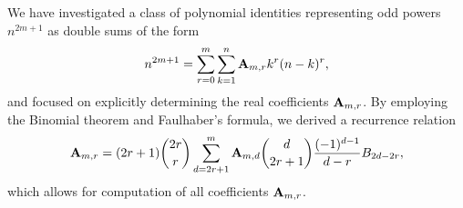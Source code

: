 ﻿We have investigated a class of polynomial identities representing odd powers $n^{2m+1}$ as double sums of the form
\begin{align*}
    n^{2m+1} = \sum_{r=0}^{m} \sum_{k=1}^{n} {\mathbf{A}} \sb{m,r} k^r (n-k)^r,
\end{align*}
and focused on explicitly determining the real coefficients ${\mathbf{A}} \sb{m,r}$.
By employing the Binomial theorem and Faulhaber’s formula, we derived a recurrence relation
\begin{align*}
    {\mathbf{A}} \sb{m,r}
    = (2r+1) \binom{2r}{r} \sum_{d = 2r+1}^{m} {\mathbf{A}} \sb{m,d} \binom{d}{2r+1} \frac{(-1)^{d-1}}{d-r} {B}\sb{2d-2r},
\end{align*}
which allows for computation of all coefficients ${\mathbf{A}} \sb{m,r}$.
